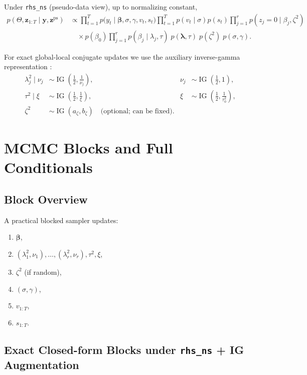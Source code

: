\documentclass[11pt]{article}
\newcommand{\vect}[1]{\bm{#1}}
\DeclareMathOperator{\IG}{IG}
\begin{document}
Under \texttt{rhs\_ns} (pseudo-data view), up to normalizing constant,
\begin{equation}
\begin{aligned}
  p(\Theta,\vect{z}_{1:T}\mid\vect{y},\vect{z}^{\mathrm{ps}})
  &\propto
  \prod_{t=1}^T p\big(y_t\mid\vect{\beta},\sigma,\gamma,v_t,s_t\big)
  \prod_{t=1}^T p(v_t\mid\sigma)p(s_t)
  \prod_{j=1}^r p(z_j=0\mid\beta_j,\zeta^2)
  \\
  &\quad\times p(\beta_0)
  \prod_{j=1}^r p(\beta_j\mid\lambda_j,\tau)
  \;p(\vect{\lambda},\tau)\;p(\zeta^2)\;p(\sigma,\gamma).
\end{aligned}
\label{eq:posterior-factorization}
\end{equation}

For exact global-local conjugate updates we use the auxiliary inverse-gamma representation
\cite{makalic-schmidt}:
\begin{align}
  \lambda_j^2\mid\nu_j &\sim \IG\!\left(\frac12,\frac{1}{\nu_j}\right), &
  \nu_j &\sim \IG\!\left(\frac12,1\right),\\
  \tau^2\mid\xi &\sim \IG\!\left(\frac12,\frac{1}{\xi}\right), &
  \xi &\sim \IG\!\left(\frac12,\frac{1}{\tau_0^2}\right),\\
  \zeta^2 &\sim \IG(a_\zeta,b_\zeta) \quad \text{(optional; can be fixed).}
\end{align}

\section{MCMC Blocks and Full Conditionals}
\label{sec:mcmc}

\subsection{Block Overview}

A practical blocked sampler updates:
\begin{enumerate}[leftmargin=1.7em]
  \item $\vect{\beta}$,
  \item $(\lambda_1^2,\nu_1),\dots,(\lambda_r^2,\nu_r),\tau^2,\xi$,
  \item $\zeta^2$ (if random),
  \item $(\sigma,\gamma)$,
  \item $v_{1:T}$,
  \item $s_{1:T}$.
\end{enumerate}

\subsection{Exact Closed-form Blocks under \texttt{rhs\_ns} + IG Augmentation}
\end{document}
